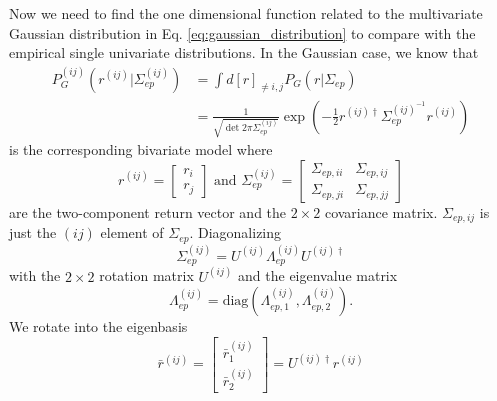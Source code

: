 Now we need to find the one dimensional function related to the multivariate
Gaussian distribution in Eq. \ref{eq:gaussian_distribution} to compare with the
empirical  single univariate distributions. In the Gaussian case, we know that
\begin{align}
    P_{G}^{\left( ij \right)} \left( r^{\left( ij \right)} |
    \Sigma_{ep}^{\left( ij \right)} \right)
    &= \int d \left[ r \right]_{\ne i,j} P_{G} \left( r | \Sigma_{ep} \right)\\
    &= \frac{1}{\sqrt{\det 2 \pi \Sigma_{ep}^{\left( ij \right)}}}
    \exp \left( -\frac{1}{2} r^{\left( ij \right) \dagger}
    \Sigma_{ep}^{\left( ij \right)^{ - 1}} r^{\left( ij \right)} \right)
\end{align}
is the corresponding bivariate model where
\begin{equation}
    r^{\left(ij\right)}=\left[\begin{array}{c}
    r_{i}\\
    r_{j}
    \end{array}\right]\text{ and } \Sigma_{ep}^{\left(ij\right)}
    =\left[\begin{array}{cc}
    \Sigma_{ep,ii} & \Sigma_{ep,ij}\\
    \Sigma_{ep,ji} & \Sigma_{ep,jj}
    \end{array}\right]
\end{equation}
are the two-component return vector and the $2 \times 2$ covariance matrix.
$\Sigma_{ep,ij}$ is just the $\left( ij \right)$ element of $\Sigma_{ep}$.
Diagonalizing
\begin{equation}
    \Sigma_{ep}^{\left(ij\right)}=U^{\left(ij\right)}
    \Lambda_{ep}^{\left(ij\right)}U^{\left(ij\right)\dagger}
\end{equation}
with the $2 \times 2$ rotation matrix $U^{\left( ij \right)}$ and the
eigenvalue matrix
\begin{equation}
    \Lambda_{ep}^{\left( ij \right)} = \text{diag}
    \left( \Lambda_{ep,1}^{\left( ij \right)},
    \Lambda_{ep,2}^{\left( ij \right)} \right).
\end{equation}
We rotate into the eigenbasis
\begin{equation}
    \bar{r}^{\left(ij\right)}=\left[\begin{array}{c}
    \bar{r}_{1}^{\left(ij\right)}\\
    \bar{r}_{2}^{\left(ij\right)}
    \end{array}\right]=U^{\left(ij\right)\dagger}r^{\left(ij\right)}
\end{equation}
